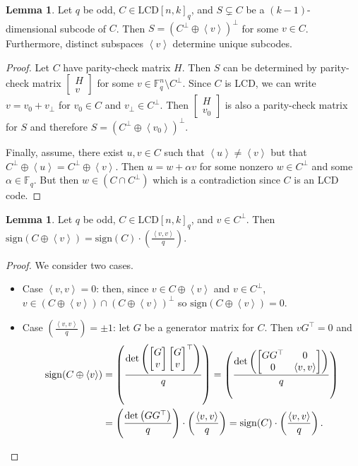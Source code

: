 \documentclass[11pt]{article}
\theoremstyle{definition}
\newtheorem{lemma}[theorem]{Lemma}
\newcommand{\F}{\mathbb{F}}
\newcommand{\Leg}[2]{\left(\frac{#1}{#2}\right)}                       %
\newcommand{\Sign}{\mathrm{sign}}
\newcommand{\Ang}[1]{\left\langle#1\right\rangle}
\newcommand{\LCDq}[2]{\mathrm{LCD} {[#1, #2]}_q}
\begin{document}
\begin{lemma}\label{lem:subcode-construct}
	Let $q$ be odd, $C \in \LCDq{n}{k}$, and $S \subsetneq C$ be a $(k - 1)$-dimensional subcode of $C$.
	Then $S = {(C^\bot \oplus \Ang{v})}^\bot$ for some $v \in C$.
	Furthermore, distinct subspaces $\Ang{v}$ determine unique subcodes.
\end{lemma}

\begin{proof}
	Let $C$ have parity-check matrix $H$.
	Then $S$ can be determined by parity-check matrix $\begin{bmatrix} H \\ v \end{bmatrix}$ for some $v \in \F_q^n \setminus C^\bot$.
	Since $C$ is LCD, we can write $v = v_0 + v_\bot$ for $v_0 \in C$ and $v_\bot \in C^\bot$.
	Then $\begin{bmatrix} H \\ v_0 \end{bmatrix}$ is also a parity-check matrix for $S$ and therefore $S = {(C^\bot \oplus \Ang{v_0})}^\bot$.
	
		Finally, assume, there exist $u, v \in C$ such that $\Ang{u} \neq \Ang{v}$ but that $C^\bot \oplus \Ang{u} = C^\bot \oplus \Ang{v}$.
		Then $u = w + \alpha v$ for some nonzero $w \in C^\bot$ and some $\alpha \in \F_q$.
		But then $w \in (C \cap C^\bot)$ which is a contradiction since $C$ is an LCD code.
\end{proof}

\begin{lemma}\label{lem:augment-sign}
	Let $q$ be odd, $C \in \LCDq{n}{k}$, and $v \in C^\bot$.
	Then $\Sign(C \oplus \Ang{v}) = \Sign(C) \cdot \Leg{\Ang{v, v}}{q}$.
\end{lemma}

\begin{proof}
	We consider two cases.
	\begin{itemize}
		\item Case $\Ang{v, v} = 0$: then, since $v \in C \oplus \Ang{v}$ and $v \in C^\bot$, $v \in (C \oplus \Ang{v}) \cap {(C \oplus \Ang{v})}^\bot$ so $\Sign(C \oplus \Ang{v}) = 0$.
		\item Case $\Leg{\Ang{v, v}}{q} = \pm 1$: let $G$ be a generator matrix for $C$.
			Then $vG^\top=0$ and
			\begin{align*}
				\Sign(C \oplus \Ang{v})
				&= \Leg{\det \left( \begin{bmatrix} G \\ v \end{bmatrix} {\begin{bmatrix} G \\ v \end{bmatrix}}^\top \right)}{q}
				= \Leg{\det \left( \begin{bmatrix} G G^\top & 0 \\ 0 & \Ang{v, v} \end{bmatrix} \right)}{q} \\
				&= \Leg{\det \left( G G^\top \right)}{q} \cdot \Leg{\Ang{v, v}}{q}
				= \Sign(C) \cdot \Leg{\Ang{v, v}}{q}.
				\qedhere{}
			\end{align*}
	\end{itemize}
\end{proof}
\end{document}
